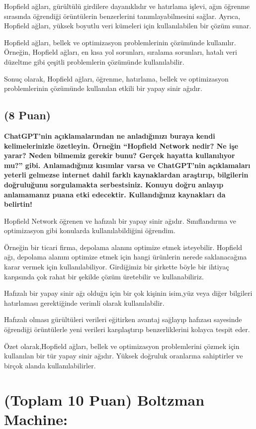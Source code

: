 \documentclass[11pt]{article}
\begin{document}
Hopfield ağları, gürültülü girdilere dayanıklıdır ve hatırlama işlevi, ağın öğrenme sırasında öğrendiği örüntülerin benzerlerini tanımlayabilmesini sağlar. Ayrıca, Hopfield ağları, yüksek boyutlu veri kümeleri için kullanılabilen bir çözüm sunar.

Hopfield ağları, bellek ve optimizasyon problemlerinin çözümünde kullanılır. Örneğin, Hopfield ağları, en kısa yol sorunları, sıralama sorunları, hatalı veri düzeltme gibi çeşitli problemlerin çözümünde kullanılabilir.

Sonuç olarak, Hopfield ağları, öğrenme, hatırlama, bellek ve optimizasyon problemlerinin çözümünde kullanılan etkili bir yapay sinir ağıdır. 

\subsection{(8 Puan)} \textbf{ChatGPT’nin açıklamalarından ne anladığınızı buraya kendi kelimelerinizle özetleyin. Örneğin ``Hopfield Network nedir? Ne işe yarar? Neden bilmemiz gerekir bunu? Gerçek hayatta kullanılıyor mu?'' gibi. Anlamadığınız kısımlar varsa ve ChatGPT’nin açıklamaları yeterli gelmezse internet dahil farklı kaynaklardan araştırıp, bilgilerin doğruluğunu sorgulamakta serbestsiniz. Konuyu doğru anlayıp anlamamanız puana etki edecektir. Kullandığınız kaynakları da belirtin!}

Hopfield Network öğrenen ve hafızalı bir yapay sinir ağıdır. Sınıflandırma ve optimizasyon gibi konularda kullanılabildiğini öğrendim. 

Örneğin bir ticari firma, depolama alanını optimize etmek isteyebilir. Hopfield ağı, depolama alanını optimize etmek için hangi ürünlerin nerede saklanacağına karar vermek için kullanılabiliyor. Girdiğimiz bir şirkette böyle bir ihtiyaç karşısında çok rahat bir şekilde çözüm üretebilir ve kullanabiliriz.

Hafızalı bir yapay sinir ağı olduğu için bir çok kişinin isim,yüz veya diğer bilgileri hatırlaması gerektiğinde  verimli olarak kullanılabilir.

Hafızalı olması gürültüleri verileri eğitirken avantaj sağlayıp hafızası sayesinde öğrendiği örüntülerle yeni verileri karşılaştırıp benzerliklerini kolayca tespit eder.

Özet olarak,Hopfield ağları, bellek ve optimizasyon problemlerini çözmek için kullanılan bir tür yapay sinir ağıdır. Yüksek doğruluk oranlarına sahiptirler ve birçok alanda kullanılabilirler.

\section{(Toplam 10 Puan) Boltzman Machine:}
\end{document}
